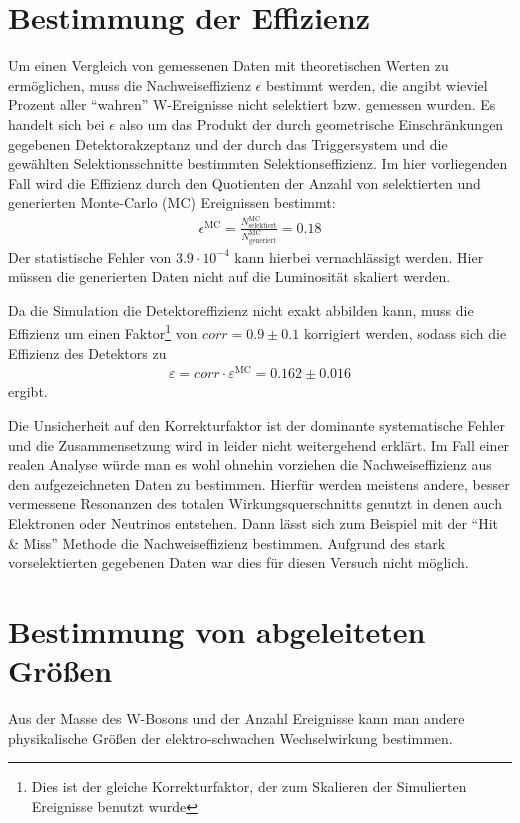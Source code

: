 \documentclass[a4paper,12pt]{article}
\begin{document}
\section{Bestimmung der Effizienz}
\label{effizienz}
Um einen Vergleich von gemessenen Daten mit theoretischen Werten zu ermöglichen, muss die Nachweiseffizienz
$\epsilon$ bestimmt werden, die angibt wieviel Prozent aller "`wahren"' W-Ereignisse nicht selektiert bzw. gemessen wurden.
Es handelt sich bei $\epsilon$ also um das Produkt der durch geometrische Einschränkungen gegebenen Detektorakzeptanz und der
durch das Triggersystem und die gewählten Selektionsschnitte bestimmten Selektionseffizienz. Im hier vorliegenden Fall wird die
Effizienz durch den Quotienten der Anzahl von selektierten und generierten Monte-Carlo (MC) Ereignissen bestimmt:
\begin{align*}
	\epsilon^\text{MC} = \frac{N^\text{MC}_\text{selektiert}}{N^\text{MC}_\text{generiert}} = 0.18
\end{align*}
Der statistische Fehler von $3.9\cdot 10^{-4}$ kann hierbei vernachlässigt werden.
Hier müssen die generierten Daten nicht auf die Luminosität skaliert werden.

Da die Simulation die Detektoreffizienz nicht exakt abbilden kann, muss die Effizienz um einen
Faktor\footnote{Dies ist der gleiche Korrekturfaktor, der zum Skalieren der Simulierten Ereignisse benutzt
wurde}  von $corr = 0.9±0.1$
korrigiert werden, sodass sich die Effizienz des Detektors zu
\begin{align*}
	ε = corr \cdot ε^\text{MC} = 0.162±0.016
\end{align*}
ergibt.

Die Unsicherheit auf den Korrekturfaktor ist der dominante systematische Fehler und die Zusammensetzung wird in \cite{versuchsanleitung} leider nicht weitergehend erklärt. Im Fall einer realen Analyse würde man es wohl ohnehin vorziehen die Nachweiseffizienz aus
den aufgezeichneten Daten zu bestimmen. Hierfür werden meistens andere, besser vermessene Resonanzen des totalen Wirkungsquerschnitts genutzt
in denen auch Elektronen oder Neutrinos entstehen. Dann lässt sich zum Beispiel mit der "`Hit \&
Miss"' Methode die Nachweiseffizienz bestimmen. Aufgrund
des stark vorselektierten gegebenen Daten war dies für diesen Versuch nicht möglich.

\newpage
\section{Bestimmung von abgeleiteten Größen}
Aus der Masse des W-Bosons und der Anzahl Ereignisse kann man andere physikalische Größen
der elektro-schwachen Wechselwirkung bestimmen.
\end{document}
